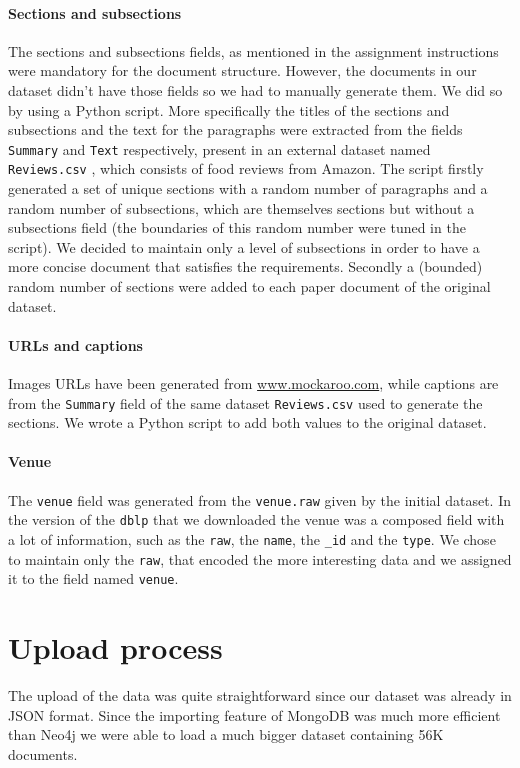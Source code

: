 \paragraph{Sections and subsections}
The sections and subsections fields, as mentioned in the assignment instructions were mandatory for the document structure.
However, the documents in our dataset didn't have those fields so we had to manually generate them.
We did so by using a Python script.
More specifically the titles of the sections and subsections and the text for the paragraphs were extracted from the fields \verb|Summary| and \verb|Text| respectively, present in an external dataset named \verb|Reviews.csv|
\footnotemark{}, which consists of food reviews from Amazon.
The script firstly generated a set of unique sections with a random number of paragraphs and a random number of subsections, which are themselves sections but without a subsections field (the boundaries of this random number were tuned in the script).
We decided to maintain only a level of subsections in order to have a more concise document that satisfies the requirements.
Secondly a (bounded) random number of sections were added to each paper document of the original dataset.

\paragraph{URLs and captions} Images URLs have been generated from \href{https://www.mockaroo.com}{www.mockaroo.com}, while captions are from the \verb|Summary| field of the same dataset \verb|Reviews.csv| used to generate the sections.
We wrote a Python script to add both values to the original dataset.

\paragraph{Venue} The \verb|venue| field was generated from the \verb|venue.raw| given by the initial dataset.
In the version of the \verb|dblp| that we downloaded the venue was a composed field with a lot of information, such as the \verb|raw|, the \verb|name|, the \verb|_id| and the \verb|type|.
We chose to maintain only the \verb|raw|, that encoded the more interesting data and we assigned it to the field named \verb|venue|.


\section{Upload process}
\label{sec:upload_process_mongodb}%
The upload of the data was quite straightforward since our dataset was already in JSON format.
Since the importing feature of MongoDB was much more efficient than Neo4j we were able to load a much bigger dataset containing 56K documents.

